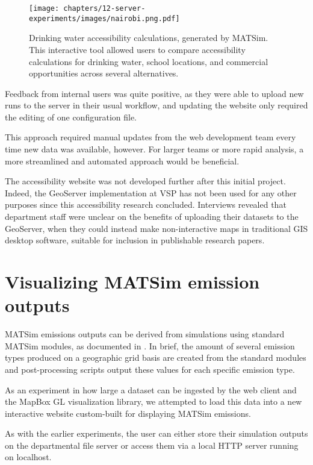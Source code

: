 \begin{figure}[!ht]
  \texttt{[image: chapters/12-server-experiments/images/nairobi.png.pdf]}
  \caption[Drinking water accessibility calculations, generated by MATSim]{Drinking water accessibility calculations, generated by MATSim. This interactive tool allowed users to compare accessibility calculations for drinking water, school locations, and commercial opportunities across several alternatives.}
  \label{fig:nairobi}
\end{figure}

Feedback from internal users was quite positive, as they were able to upload new runs to the server in their usual workflow, and updating the website only required the editing of one configuration file.

This approach required manual updates from the web development team every time new data was available, however. For larger teams or more rapid analysis, a more streamlined and automated approach would be beneficial.

The accessibility website was not developed further after this initial project. Indeed, the GeoServer implementation at VSP has not been used for any other purposes since this accessibility research concluded. Interviews revealed that department staff were unclear on the benefits of uploading their datasets to the GeoServer, when they could instead make non-interactive maps in traditional GIS desktop software, suitable for inclusion in publishable research papers.

\hypertarget{server-experiments-emissions}{%
\section{Visualizing MATSim emission outputs}
\label{server-experiments-emissions}}

MATSim emissions outputs can be derived from simulations using standard MATSim modules, as documented in \cite{Kickhoefer2015EmissionModeling}. In brief, the amount of several emission types produced on a geographic grid basis are created from the standard modules and post-processing scripts output these values for each specific emission type.

As an experiment in how large a dataset can be ingested by the web client and the MapBox GL visualization library, we attempted to load this data into a new interactive website custom-built for displaying MATSim emissions.

As with the earlier experiments, the user can either store their simulation outputs on the departmental file server or access them via a local HTTP server running on localhost.

